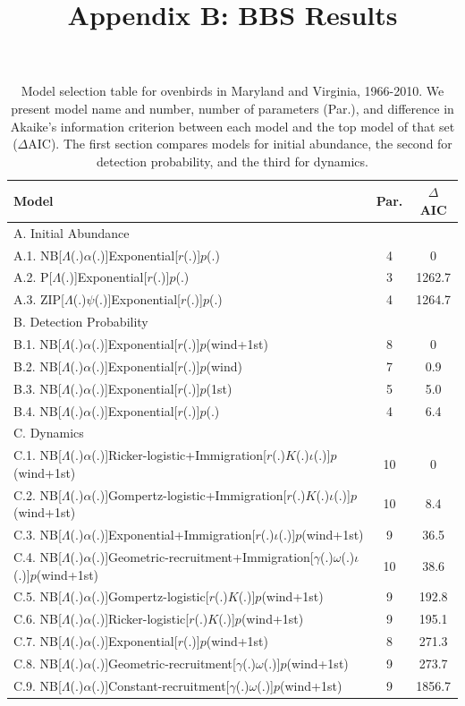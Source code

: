 \documentclass{article}
\begin{document}
\title{Appendix B: BBS Results}
\maketitle
\renewcommand*\thetable{B\arabic{table}}
\renewcommand*\thefigure{B\arabic{figure}}
\begin{table}[htb]
  \centering
  \small
\caption{Model selection table for ovenbirds in Maryland and Virginia,
    1966-2010.  We present model name and number, number of 
parameters (Par.), and difference in Akaike's
information criterion between each model and the top model of
that set ($\Delta$AIC).  The first section compares
models for initial abundance, the second for detection
probability, and the third for dynamics.}
  \begin{tabular}[h]{lcc}
\hline
Model	&Par.	&$\Delta$AIC	\\
\hline
A. Initial Abundance && \\
A.1. NB[$\Lambda$(.)$\alpha$(.)]Exponential[$r$(.)]$p$(.)	&4	&0\\
A.2. P[$\Lambda$(.)]Exponential[$r$(.)]$p$(.)	&3	&1262.7\\
A.3. ZIP[$\Lambda$(.)$\psi$(.)]Exponential[$r$(.)]$p$(.)	&4 &1264.7\\
\hline
B. Detection Probability && \\
B.1. NB[$\Lambda$(.)$\alpha$(.)]Exponential[$r$(.)]$p$(wind+1st)	&8 &0	\\
B.2. NB[$\Lambda$(.)$\alpha$(.)]Exponential[$r$(.)]$p$(wind) &7 &0.9\\
B.3. NB[$\Lambda$(.)$\alpha$(.)]Exponential[$r$(.)]$p$(1st)	&5	&5.0
\\B.4. NB[$\Lambda$(.)$\alpha$(.)]Exponential[$r$(.)]$p$(.)	&4	&6.4\\
\hline
C. Dynamics && \\
C.1. NB[$\Lambda$(.)$\alpha$(.)]Ricker-logistic+Immigration[$r$(.)$K$(.)$\iota$(.)]$p$(wind+1st) &10	&0	\\
C.2. NB[$\Lambda$(.)$\alpha$(.)]Gompertz-logistic+Immigration[$r$(.)$K$(.)$\iota$(.)]$p$(wind+1st) &10	&8.4 \\
C.3. NB[$\Lambda$(.)$\alpha$(.)]Exponential+Immigration[$r$(.)$\iota$(.)]$p$(wind+1st) &9	&36.5\\
C.4. NB[$\Lambda$(.)$\alpha$(.)]Geometric-recruitment+Immigration[$\gamma$(.)$\omega$(.)$\iota$(.)]$p$(wind+1st) &10	&38.6\\
C.5. NB[$\Lambda$(.)$\alpha$(.)]Gompertz-logistic[$r$(.)$K$(.)]$p$(wind+1st) &9	&192.8\\
C.6. NB[$\Lambda$(.)$\alpha$(.)]Ricker-logistic[$r$(.)$K$(.)]$p$(wind+1st) &9	&195.1\\
C.7. NB[$\Lambda$(.)$\alpha$(.)]Exponential[$r$(.)]$p$(wind+1st)	&8 &271.3\\
C.8. NB[$\Lambda$(.)$\alpha$(.)]Geometric-recruitment[$\gamma$(.)$\omega$(.)]$p$(wind+1st) &9	&273.7\\
C.9. NB[$\Lambda$(.)$\alpha$(.)]Constant-recruitment[$\gamma$(.)$\omega$(.)]$p$(wind+1st) &9	&1856.7\\
\hline
\end{tabular}
\end{table}
\clearpage
\end{document}
